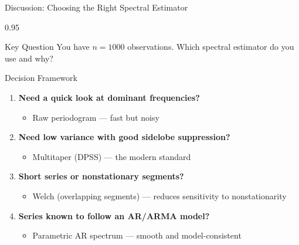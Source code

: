 \documentclass[9pt, aspectratio=169, t]{beamer}
\begin{document}
\begin{frame}{Discussion: Choosing the Right Spectral Estimator}
    \begin{cminipage}{0.95\textwidth}
    {\small
    \begin{alertblock}{Key Question}
        You have $n = 1000$ observations. Which spectral estimator do you use and why?
    \end{alertblock}
    \begin{block}{Decision Framework}
        \begin{enumerate}\setlength{\itemsep}{0pt}
            \item \textbf{Need a quick look at dominant frequencies?}
                \begin{itemize}\setlength{\itemsep}{0pt}
                    \item Raw periodogram --- fast but noisy
                \end{itemize}
            \item \textbf{Need low variance with good sidelobe suppression?}
                \begin{itemize}\setlength{\itemsep}{0pt}
                    \item Multitaper (DPSS) --- the modern standard
                \end{itemize}
            \item \textbf{Short series or nonstationary segments?}
                \begin{itemize}\setlength{\itemsep}{0pt}
                    \item Welch (overlapping segments) --- reduces sensitivity to nonstationarity
                \end{itemize}
            \item \textbf{Series known to follow an AR/ARMA model?}
                \begin{itemize}\setlength{\itemsep}{0pt}
                    \item Parametric AR spectrum --- smooth and model-consistent
                \end{itemize}
        \end{enumerate}
    \end{block}
    }
    \end{cminipage}
\end{frame}
\end{document}
